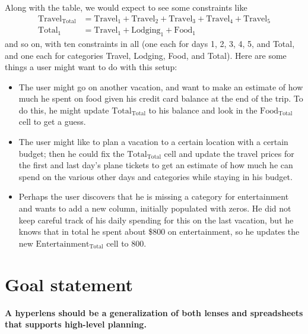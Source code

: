 Along with the table, we would expect to see some constraints like
\begin{align*}
    \mathrm{Travel}_\mathrm{Total} &=
    \mathrm{Travel}_1+\mathrm{Travel}_2+\mathrm{Travel}_3+\mathrm{Travel}_4+\mathrm{Travel}_5
    \\
    \mathrm{Total}_1 &= \mathrm{Travel_1}+\mathrm{Lodging}_1+\mathrm{Food}_1
\end{align*}
and so on, with ten constraints in all (one each for days 1, 2, 3, 4, 5, and
Total, and one each for categories Travel, Lodging, Food, and Total). Here
are some things a user might want to do with this setup:
\begin{itemize}
    \item The user might go on another vacation, and want to make an
        estimate of how much he spent on food given his credit card balance
        at the end of the trip. To do this, he might update
        $\mathrm{Total}_\mathrm{Total}$ to his balance and look in the
        $\mathrm{Food}_\mathrm{Total}$ cell to get a guess.
    \item The user might like to plan a vacation to a certain
        location with a certain budget; then he could fix the
        $\mathrm{Total}_\mathrm{Total}$ cell and update the travel prices
        for the first and last day's plane tickets to get an estimate of how
        much he can spend on the various other days and categories while
        staying in his budget.
    \item Perhaps the user discovers that he is missing a category for
        entertainment and wants to add a new column, initially populated
        with zeros. He did not keep careful track of his daily spending for
        this on the last vacation, but he knows that in total he spent about
        \$800 on entertainment, so he updates the new
        $\mathrm{Entertainment}_\mathrm{Total}$ cell to 800.
\end{itemize}

\section{Goal statement}
\label{sec:goal_statement}
{\bf A hyperlens should be a generalization of both lenses and spreadsheets that
supports high-level planning.}

